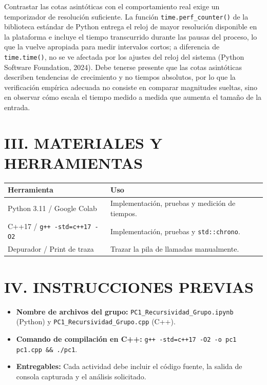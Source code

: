 \documentclass[12pt,a4paper]{article}
\begin{document}
Contrastar las cotas asintóticas con el comportamiento real exige un temporizador de
resolución suficiente. La función \texttt{time.perf\_counter()} de la biblioteca estándar
de Python entrega el reloj de mayor resolución disponible en la plataforma e incluye el
tiempo transcurrido durante las pausas del proceso, lo que la vuelve apropiada para medir
intervalos cortos; a diferencia de \texttt{time.time()}, no se ve afectada por los ajustes
del reloj del sistema (Python Software Foundation, 2024). Debe tenerse presente que las
cotas asintóticas describen tendencias de crecimiento y no tiempos absolutos, por lo que
la verificación empírica adecuada no consiste en comparar magnitudes sueltas, sino en
observar cómo escala el tiempo medido a medida que aumenta el tamaño de la entrada.

\section*{III. MATERIALES Y HERRAMIENTAS}

\begin{center}
\begin{tabularx}{\textwidth}{|>{\raggedright\arraybackslash}p{5.5cm}|X|}
\hline
\textbf{Herramienta} & \textbf{Uso} \\
\hline
Python 3.11 / Google Colab & Implementación, pruebas y medición de tiempos. \\
\hline
C++17 / \texttt{g++ -std=c++17 -O2} & Implementación, pruebas y \texttt{std::chrono}. \\
\hline
Depurador / Print de traza & Trazar la pila de llamadas manualmente. \\
\hline
\end{tabularx}
\end{center}

\section*{IV. INSTRUCCIONES PREVIAS}

\begin{itemize}[leftmargin=*]
    \item \textbf{Nombre de archivos del grupo:} \texttt{PC1\_Recursividad\_Grupo.ipynb}
    (Python) y \texttt{PC1\_Recursividad\_Grupo.cpp} (C++).
    \item \textbf{Comando de compilación en C++:}
    \texttt{g++ -std=c++17 -O2 -o pc1 pc1.cpp \&\& ./pc1}.
    \item \textbf{Entregables:} Cada actividad debe incluir el código fuente, la salida
    de consola capturada y el análisis solicitado.
\end{itemize}
\end{document}
